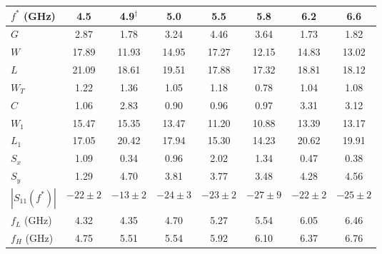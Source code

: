 \begin{tabular}{lccccccc}
\toprule
$f^*$ (GHz) & 4.5 & 4.9$^\dagger$ & 5.0 & 5.5 & 5.8 & 6.2 & 6.6 \\
\midrule
$G$ & 2.87 & 1.78 & 3.24 & 4.46 & 3.64 & 1.73 & 1.82 \\
$W$ & 17.89 & 11.93 & 14.95 & 17.27 & 12.15 & 14.83 & 13.02 \\
$L$ & 21.09 & 18.61 & 19.51 & 17.88 & 17.32 & 18.81 & 18.12 \\
$W_T$ & 1.22 & 1.36 & 1.05 & 1.18 & 0.78 & 1.04 & 1.08 \\
$C$ & 1.06 & 2.83 & 0.90 & 0.96 & 0.97 & 3.31 & 3.12 \\
$W_1$ & 15.47 & 15.35 & 13.47 & 11.20 & 10.88 & 13.39 & 13.17 \\
$L_1$ & 17.05 & 20.42 & 17.94 & 15.30 & 14.23 & 20.62 & 19.91 \\
$S_x$ & 1.09 & 0.34 & 0.96 & 2.02 & 1.34 & 0.47 & 0.38 \\
$S_y$ & 1.29 & 4.70 & 3.81 & 3.77 & 3.48 & 4.28 & 4.56 \\
$|S_{11}(f^*)|$ & $-22{\pm}2$ & $-13{\pm}2$ & $-24{\pm}3$ & $-23{\pm}2$ & $-27{\pm}9$ & $-22{\pm}2$ & $-25{\pm}2$ \\
$f_L$ (GHz) & 4.32 & 4.35 & 4.70 & 5.27 & 5.54 & 6.05 & 6.46 \\
$f_H$ (GHz) & 4.75 & 5.51 & 5.54 & 5.92 & 6.10 & 6.37 & 6.76 \\
\bottomrule
\end{tabular}
